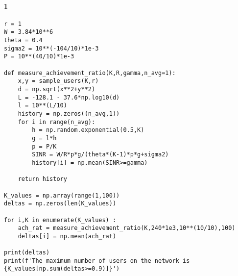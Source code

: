 \documentclass[a4paper,11pt,2]{article}
\begin{document}
\paragraph{1}
\begin{center}
\begin{lstlisting}
r = 1
W = 3.84*10**6
theta = 0.4
sigma2 = 10**(-104/10)*1e-3
P = 10**(40/10)*1e-3

def measure_achievement_ratio(K,R,gamma,n_avg=1):
    x,y = sample_users(K,r)
    d = np.sqrt(x**2+y**2)
    L = -128.1 - 37.6*np.log10(d)
    l = 10**(L/10)
    history = np.zeros((n_avg,1))
    for i in range(n_avg):
        h = np.random.exponential(0.5,K)
        g = l*h
        p = P/K
        SINR = W/R*p*g/(theta*(K-1)*p*g+sigma2)
        history[i] = np.mean(SINR>=gamma)

    return history

K_values = np.array(range(1,100))
deltas = np.zeros(len(K_values))

for i,K in enumerate(K_values) :
    ach_rat = measure_achievement_ratio(K,240*1e3,10**(10/10),100)
    deltas[i] = np.mean(ach_rat)

print(deltas)
print(f'The maximum number of users on the network is {K_values[np.sum(deltas>=0.9)]}')
\end{lstlisting}
\end{center}
\end{document}
